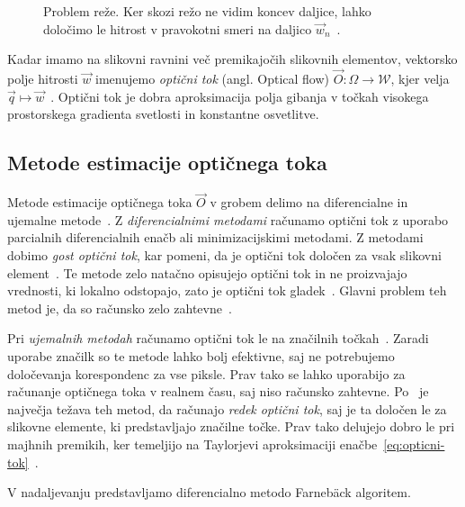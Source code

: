 \begin{figure}[htb]
\centering

\caption[Problem reže]{Problem reže. Ker skozi režo ne vidim koncev daljice, lahko določimo le hitrost v pravokotni smeri na daljico $\vec{w}_n$~\cite{trucco1998introductory}.}
\label{fig:aperture-problem}
\end{figure}




Kadar imamo na slikovni ravnini več premikajočih slikovnih elementov, vektorsko polje hitrosti $\vec{w}$ imenujemo \emph{optični tok} (angl. Optical flow) $\vec{O}: \varOmega \to \mathcal{W}$, kjer velja $ \vec{q} \mapsto \vec{w}$~\cite{trucco1998introductory}. Optični tok je dobra aproksimacija polja gibanja v točkah visokega prostorskega gradienta svetlosti in konstantne osvetlitve.



\subsection{Metode estimacije optičnega toka}\label{sec:metode-of}

Metode estimacije optičnega toka $\vec{O}$ v grobem delimo na diferencialne in {ujemalne} metode~\cite{trucco1998introductory}. Z \emph{diferencialnimi metodami} računamo optični tok z uporabo parcialnih diferencialnih enačb ali minimizacijskimi metodami. Z metodami dobimo \emph{gost optični tok}, kar pomeni, da je optični tok določen za vsak slikovni element~\cite{trucco1998introductory}. Te metode zelo natačno opisujejo optični tok in ne proizvajajo vrednosti, ki lokalno odstopajo, zato je optični tok gladek~\cite{brox2011large}.  Glavni problem teh metod je, da so računsko zelo zahtevne~\cite{trucco1998introductory}.

Pri \emph{ujemalnih metodah} računamo optični tok le na značilnih točkah~\cite{trucco1998introductory}. Zaradi uporabe značilk so te metode lahko bolj efektivne, saj ne potrebujemo določevanja korespondenc za vse piksle. Prav tako se lahko uporabijo za računanje optičnega toka v realnem času, saj niso računsko zahtevne. Po~\cite{trucco1998introductory} je največja težava teh metod, da računajo \emph{redek optični tok}, saj je ta določen le za slikovne elemente, ki predstavljajo značilne točke. Prav tako delujejo dobro le pri majhnih premikih, ker temeljijo na Taylorjevi aproksimaciji enačbe~\eqref{eq:opticni-tok}~\cite{wedel2011stereo}. 

V nadaljevanju predstavljamo diferencialno metodo Farneb{\"a}ck algoritem.

